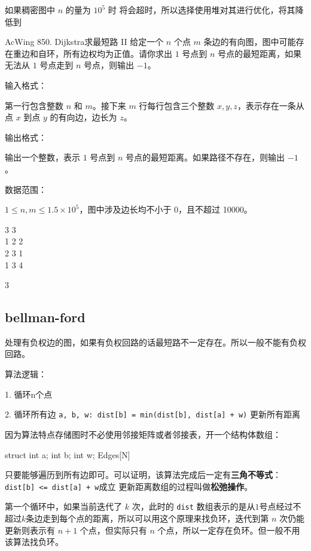 如果稠密图中 $n$ 的量为 $10^5$ 时  将会超时，所以选择使用堆对其进行优化，将其降低到 

\begin{titledbox}{AcWing 850. Dijkstra求最短路 II}
给定一个 $n$ 个点 $m$ 条边的有向图，图中可能存在重边和自环，所有边权均为正值。请你求出 $1$ 号点到 $n$ 号点的最短距离，如果无法从 $1$ 号点走到 $n$ 号点，则输出 $-1$。

输入格式：

第一行包含整数 $n$ 和 $m$。接下来 $m$ 行每行包含三个整数 $x,y,z$，表示存在一条从点 $x$ 到点 $y$ 的有向边，边长为 $z$。

输出格式：

输出一个整数，表示 $1$ 号点到 $n$ 号点的最短距离。如果路径不存在，则输出 $-1$。

数据范围：

$1 \le n, m \le 1.5 \times 10^5$，图中涉及边长均不小于 0，且不超过 10000。

\begin{inputblock}
    3 3 \\
    1 2 2 \\
    2 3 1 \\
    1 3 4
\end{inputblock}
\begin{outputblock}
    3
\end{outputblock}
\end{titledbox}


\subsection{bellman-ford}
处理有负权边的图，如果有负权回路的话最短路不一定存在。所以一般不能有负权回路。

算法逻辑：

1. 循环n个点

2. 循环所有边 \lstinline{a, b, w: dist[b] = min(dist[b], dist[a] + w)} 更新所有距离

因为算法特点存储图时不必使用邻接矩阵或者邻接表，开一个结构体数组：

\begin{mycpponecol}[边集]
struct {
    int a;
    int b;
    int w;
} Edges[N]
\end{mycpponecol}

只要能够遍历到所有边即可。可以证明，该算法完成后一定有\textbf{三角不等式}：\lstinline{dist[b] <= dist[a] + w}成立
更新距离数组的过程叫做\textbf{松弛操作}。

第一个循环中，如果当前迭代了 $k$ 次，此时的 \lstinline{dist} 数组表示的是从$1$号点经过不超过$k$条边走到每个点的距离，所以可以用这个原理来找负环，迭代到第 $n$ 次仍能更新则表示有 $n+1$ 个点，但实际只有 $n$ 个点，所以一定存在负环。但一般不用该算法找负环。

